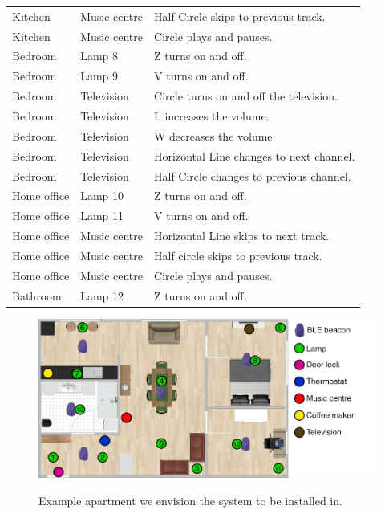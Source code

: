 \begin{table}[]
\begin{tabular}{lll}
Kitchen                    & Music centre                        & Half Circle skips to previous track.     \\
Kitchen                    & Music centre                        & Circle plays and pauses.                 \\
Bedroom                    & Lamp 8                              & Z turns on and off.                      \\
Bedroom                    & Lamp 9                              & V turns on and off.                      \\
Bedroom                    & Television                          & Circle turns on and off the television.  \\
Bedroom                    & Television                          & L increases the volume.                  \\
Bedroom                    & Television                          & W decreases the volume.                  \\
Bedroom                    & Television                          & Horizontal Line changes to next channel. \\
Bedroom                    & Television                          & Half Circle changes to previous channel. \\
Home office                & Lamp 10                             & Z turns on and off.                      \\
Home office                & Lamp 11                             & V turns on and off.                      \\
Home office                & Music centre                        & Horizontal Line skips to next track.     \\
Home office                & Music centre                        & Half circle skips to previous track.     \\
Home office                & Music centre                        & Circle plays and pauses.                 \\
Bathroom                   & Lamp 12                             & Z turns on and off.                     
\end{tabular}
\end{table}

\begin{figure}[h!]
\centering
\includegraphics[width=\textwidth]{images/room-with-beacons}
\label{fig:analysis:scenario:apartment}
\caption{Example apartment we envision the system to be installed in.}
\end{figure}

